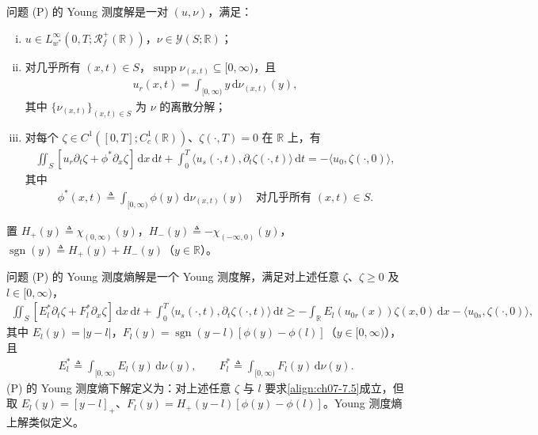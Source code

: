 \documentclass[../../main.tex]{subfiles}%
\begin{document}
\begin{definition}\label{definition:ch07-young测度解}
问题 (P) 的 Young 测度解是一对 $(u,\nu)$，满足：
\begin{enumerate}[(i)]
\item $u\in L^\infty_{w^*}(0,T;\mathscr{R}_f^+(\mathbb{R}))$，$\nu\in\mathcal{Y}(S;\mathbb{R})$；
\item 对几乎所有 $(x,t)\in S$，$\operatorname{supp}\nu_{(x,t)}\subseteq[0,\infty)$，且
\begin{align}
u_r(x,t)=\int_{[0,\infty)}y\,\mathrm{d}\nu_{(x,t)}(y), \label{align:ch07-7.2}
\end{align}
其中 $\{\nu_{(x,t)}\}_{(x,t)\in S}$ 为 $\nu$ 的离散分解；
\item 对每个 $\zeta\in C^1([0,T];C^1_c(\mathbb{R}))$、$\zeta(\cdot,T)=0$ 在 $\mathbb{R}$ 上，有
\begin{align}
\iint_S[u_r\partial_t\zeta+\phi^*\partial_x\zeta]\,\mathrm{d}x\,\mathrm{d}t
+\int_0^T\langle u_s(\cdot,t),\partial_t\zeta(\cdot,t)\rangle\,\mathrm{d}t
=-\langle u_0,\zeta(\cdot,0)\rangle, \label{align:ch07-7.3}
\end{align}
其中
\begin{align}
\phi^*(x,t)\triangleq \int_{[0,\infty)}\phi(y)\,\mathrm{d}\nu_{(x,t)}(y)
\quad\text{对几乎所有 }(x,t)\in S. \label{align:ch07-7.4}
\end{align}
\end{enumerate}
\end{definition}

置 $H_+(y)\triangleq \chi_{(0,\infty)}(y)$，$H_-(y)\triangleq -\chi_{(-\infty,0)}(y)$，$\operatorname{sgn}(y)\triangleq H_+(y)+H_-(y)$（$y\in\mathbb{R}$）。

\begin{definition}\label{definition:ch07-young熵解}
问题 (P) 的 Young 测度熵解是一个 Young 测度解，满足对上述任意 $\zeta$、$\zeta\geqslant0$ 及 $l\in[0,\infty)$，
\begin{align}
\iint_S[E_l^*\partial_t\zeta+F_l^*\partial_x\zeta]\,\mathrm{d}x\,\mathrm{d}t
+\int_0^T\langle u_s(\cdot,t),\partial_t\zeta(\cdot,t)\rangle\,\mathrm{d}t
\geqslant-\int_{\mathbb{R}}E_l(u_{0r}(x))\zeta(x,0)\,\mathrm{d}x
-\langle u_{0s},\zeta(\cdot,0)\rangle, \label{align:ch07-7.5}
\end{align}
其中 $E_l(y)=|y-l|$，$F_l(y)=\operatorname{sgn}(y-l)[\phi(y)-\phi(l)]$（$y\in[0,\infty)$），且
\begin{align*}
E_l^*\triangleq \int_{[0,\infty)}E_l(y)\,\mathrm{d}\nu(y),\qquad
F_l^*\triangleq \int_{[0,\infty)}F_l(y)\,\mathrm{d}\nu(y).
\end{align*}
(P) 的 Young 测度熵下解定义为：对上述任意 $\zeta$ 与 $l$ 要求\eqref{align:ch07-7.5}成立，但取 $E_l(y)=[y-l]_+$、$F_l(y)=H_+(y-l)[\phi(y)-\phi(l)]$。Young 测度熵上解类似定义。
\end{definition}
\end{document}
